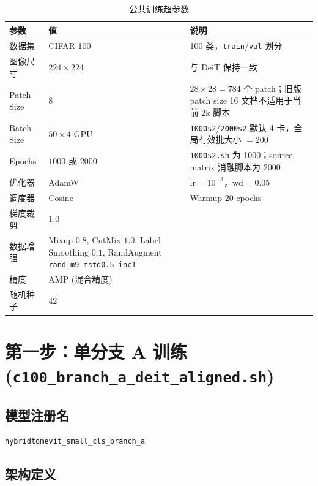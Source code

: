 \documentclass[a4paper,11pt]{article}
\begin{document}
\begin{table}[h]
\centering
\caption{公共训练超参数}
\begin{tabular}{l l p{8cm}}
\toprule
\textbf{参数} & \textbf{值} & \textbf{说明} \\
\midrule
数据集 & CIFAR-100 & 100 类，\texttt{train}/\texttt{val} 划分 \\
图像尺寸 & $224 \times 224$ & 与 DeiT 保持一致 \\
Patch Size & $8$ & $28 \times 28 = 784$ 个 patch；旧版 patch size 16 文档不适用于当前 2k 脚本 \\
Batch Size & $50 \times 4$ GPU & \texttt{1000s2}/\texttt{2000s2} 默认 4 卡，全局有效批大小 $=200$ \\
Epochs & $1000$ 或 $2000$ & \texttt{1000s2.sh} 为 1000；source matrix 消融脚本为 2000 \\
优化器 & AdamW & $\text{lr}=10^{-3}$，$\text{wd}=0.05$ \\
调度器 & Cosine & Warmup $20$ epochs \\
梯度裁剪 & $1.0$ & \\
数据增强 & \makecell[l]{Mixup $0.8$, CutMix $1.0$, \\ Label Smoothing $0.1$, \\ RandAugment \texttt{rand-m9-mstd0.5-inc1}} & \\
精度 & AMP (混合精度) & \\
随机种子 & $42$ & \\
\bottomrule
\end{tabular}
\end{table}

\section{第一步：单分支 A 训练 (\texttt{c100\_branch\_a\_deit\_aligned.sh})}

\subsection{模型注册名}

\texttt{hybridtomevit\_small\_cls\_branch\_a}

\subsection{架构定义}
\end{document}
